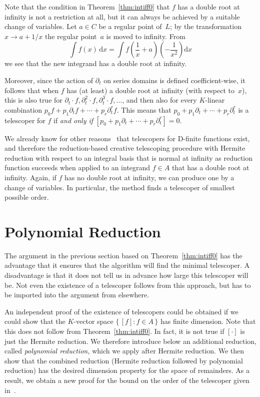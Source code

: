 \documentclass{sig-alternate}
\begin{document}
Note that the condition in Theorem~\ref{thm:intiff0} that $f$ has a double
root at infinity is not a restriction at all, but it can always be achieved by
a suitable change of variables. Let $a\in C$ be a regular point of~$L$; by
the transformation $x\to a+1/x$ the regular point~$a$ is moved to
infinity. From
\[
  \int f(x) \,\mathrm{d}x = \int f\left(\frac{1}{x}+a\right)\left(-\frac{1}{x^2}\right) \mathrm{d}x
\]
we see that the new integrand has a double root at infinity.

Moreover, since the action of $\partial_t$ on series domains is defined coefficient-wise,
it follows that when $f$ has (at least) a double root at infinity (with respect to~$x$),
this is also true for $\partial_t\cdot f, \partial_t^2\cdot f, \partial_t^3\cdot f,\dots$,
and then also for every $K$-linear combination $p_0f+p_1\partial_tf+\cdots+p_r\partial_t^rf$.
This means that $p_0+p_1\partial_t+\cdots+p_r\partial_t^r$ is a telescoper for $f$ if
\emph{and only if} $[p_0+p_1\partial_t+\cdots+p_r\partial_t^r]=0$.

We already know for other reasons~\cite{Zeilberger1990,chyzak00} that
telescopers for D-finite functions exist, and therefore the reduction-based
creative telescoping procedure with Hermite reduction with respect to an
integral basis that is normal at infinity as reduction function succeeds when
applied to an integrand $f\in A$ that has a double root at infinity. Again, if
$f$ has no double root at infinity, we can produce one by a change of variables.
In particular, the method finds a telescoper of smallest possible order.

\section{Polynomial Reduction}\label{sec:polynomial}

The argument in the previous section based on Theorem~\ref{thm:intiff0}
has the advantage that it ensures that the algorithm will find the minimal telescoper.
A disadvantage is that it does not tell us in advance how large this telescoper will be.
Not even the existence of a telescoper follows from this approach, but has to be imported
into the argument from elsewhere.

An independent proof of the existence of telescopers could be obtained if we could show
that the $K$-vector space $\{\,[f]:f\in A\,\}$ has finite dimension. Note that this does
not follow from Theorem~\ref{thm:intiff0}. In fact, it is not true if $[\cdot]$ is just
the Hermite reduction. We therefore introduce below an additional reduction, called
\emph{polynomial reduction,} which we apply after Hermite reduction. We then show that
the combined reduction (Hermite reduction followed by polynomial reduction) has the
desired dimension property for the space of remainders. As a result, we obtain a new
proof for the bound on the order of the telescoper given in~\cite{chen14a}.
\end{document}
